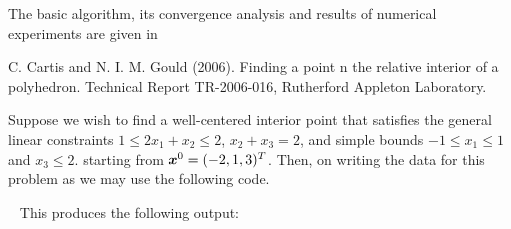 \documentclass{galahad}
\begin{document}
\vspace*{1mm}

\galreferences
\vspace*{1mm}

\noindent
The basic algorithm, its convergence analysis and results of
numerical experiments are given in
\vspace*{1mm}

\noindent
C. Cartis and N. I. M. Gould (2006).
Finding a point n the relative interior of a polyhedron.
Technical Report TR-2006-016, Rutherford Appleton Laboratory.


\galexample
Suppose we wish to find a well-centered interior point
that satisfies the general linear constraints
$1 \leq  2 x_{1}  +  x_{2}  \leq  2$, 
$x_{2}  +  x_{3}  =  2$, and simple bounds
$-1  \leq  x_{1}  \leq  1$ and $x_{3}  \leq  2$.
starting from ${\bm{x}}^{0}  =  ( -2, 1, 3 )^{T}$.
Then, on writing the data for this problem as
we may use the following code.

{\tt \small
\VerbatimInput{\packageexample}
}
\noindent
This produces the following output:
{\tt \small
\VerbatimInput{\packageresults}
}
\end{document}
